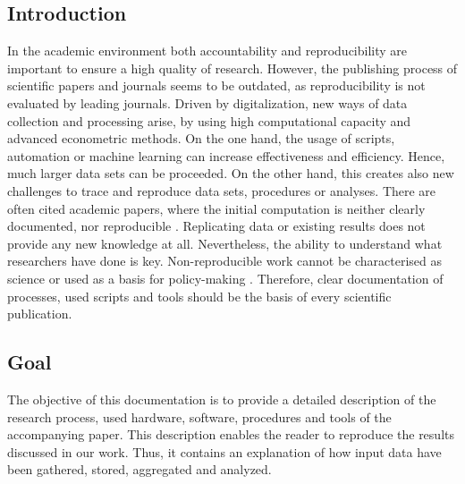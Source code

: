 \documentclass[a4paper,12pt]{article}
\begin{document}
\clearpage

\begin{spacing}{1.2}
\cleardoublepage{}

\section{Introduction}
In the academic environment both accountability and reproducibility are important to ensure a high quality of research. However, the publishing process of scientific papers and journals seems to be outdated, as reproducibility is not evaluated by leading journals. \parencite[p.~888]{mccullough2003} Driven by digitalization, new ways of data collection and processing arise, by using high computational capacity and advanced econometric methods. On the one hand, the usage of scripts, automation or machine learning can increase effectiveness and efficiency. Hence, much larger data sets can be proceeded. On the other hand, this creates also new challenges to trace and reproduce data sets, procedures or analyses. There are often cited academic papers, where the initial computation is neither clearly documented, nor reproducible \parencite[pp.~874--887]{mccullough2003}. Replicating data or existing results does not provide any new knowledge at all. Nevertheless, the ability to understand what researchers have done is key. Non-reproducible work cannot be characterised as science or used as a basis for policy-making \parencite[p.~888]{mccullough2003}. Therefore, clear documentation of processes, used scripts and tools should be the basis of every scientific publication.

\subsection{Goal}
The objective of this documentation is to provide a detailed description of the research process, used hardware, software, procedures and tools of the accompanying paper. This description enables the reader to reproduce the results discussed in our work. Thus, it contains an explanation of how  input data have been gathered, stored, aggregated and analyzed. 


\end{spacing}
\end{document}
